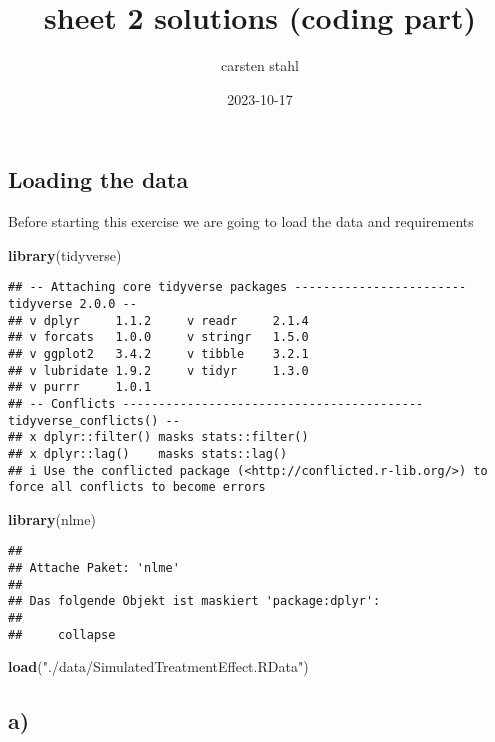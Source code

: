 \documentclass[
]{article}
\title{sheet 2 solutions (coding part)}
\author{carsten stahl}
\date{2023-10-17}
\newenvironment{Shaded}{\begin{snugshade}}{\end{snugshade}}
\newcommand{\FunctionTok}[1]{\textcolor[rgb]{0.13,0.29,0.53}{\textbf{#1}}}
\newcommand{\NormalTok}[1]{#1}
\newcommand{\StringTok}[1]{\textcolor[rgb]{0.31,0.60,0.02}{#1}}
\begin{document}
\maketitle

\hypertarget{loading-the-data}{%
\subsection{Loading the data}\label{loading-the-data}}

Before starting this exercise we are going to load the data and
requirements

\begin{Shaded}
\begin{Highlighting}[]
\FunctionTok{library}\NormalTok{(tidyverse)}
\end{Highlighting}
\end{Shaded}

\begin{verbatim}
## -- Attaching core tidyverse packages ------------------------ tidyverse 2.0.0 --
## v dplyr     1.1.2     v readr     2.1.4
## v forcats   1.0.0     v stringr   1.5.0
## v ggplot2   3.4.2     v tibble    3.2.1
## v lubridate 1.9.2     v tidyr     1.3.0
## v purrr     1.0.1     
## -- Conflicts ------------------------------------------ tidyverse_conflicts() --
## x dplyr::filter() masks stats::filter()
## x dplyr::lag()    masks stats::lag()
## i Use the conflicted package (<http://conflicted.r-lib.org/>) to force all conflicts to become errors
\end{verbatim}

\begin{Shaded}
\begin{Highlighting}[]
\FunctionTok{library}\NormalTok{(nlme)}
\end{Highlighting}
\end{Shaded}

\begin{verbatim}
## 
## Attache Paket: 'nlme'
## 
## Das folgende Objekt ist maskiert 'package:dplyr':
## 
##     collapse
\end{verbatim}

\begin{Shaded}
\begin{Highlighting}[]
\FunctionTok{load}\NormalTok{(}\StringTok{"./data/SimulatedTreatmentEffect.RData"}\NormalTok{)}
\end{Highlighting}
\end{Shaded}

\hypertarget{a}{%
\subsection{a)}\label{a}}
\end{document}
